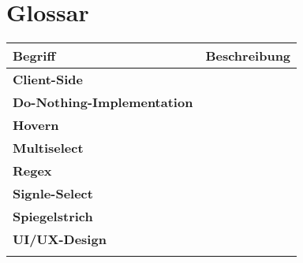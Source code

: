 \chapter{Glossar}
\label{chap:glossary}

\begin{table}[!ht]
    \label{table:Glossary}
    \footnotesize
    \begin{threeparttable}
        \begin{tabular}{ l | l }
            \bf{Begriff} & \bf{Beschreibung} \\
            \hline \hline
            \bf{Client-Side} &  \\
            \hline
            \bf{Do-Nothing-Implementation} &  \\
            \hline
            \bf{Hovern} &  \\
            \hline
            \bf{Multiselect} &  \\
            \hline
            \bf{Regex} &  \\
            \hline
            \bf{Signle-Select} &  \\
            \hline
            \bf{Spiegelstrich} &  \\
            \hline
            \bf{UI/UX-Design} &  \\
            \hline
            \bf{} &  \\
        \end{tabular}
    \end{threeparttable}
\end{table}
